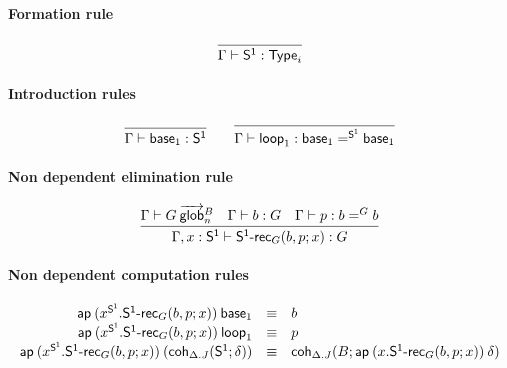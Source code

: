 \paragraph{Formation rule}

\begin{small}
  \[
  \infer{\wftype\Gamma{\dsd{S^1}}}{}
  \]
\end{small}

\paragraph{Introduction rules}

\begin{small}
  \[
  \infer{\ofglob{\Gamma}{\base{1}}{\dsd{S^1}}}{} \qquad
  \infer{\ofglob{\Gamma}{\lp{1}}{\homj{\dsd{S^1}}{\base{1}}{\base{1}}}}{}
  \]
\end{small}

\paragraph{Non dependent elimination rule}

\begin{small}
  \[
  \infer{\ofglob{\Gamma,x:\dsd{S^1}}{\dsd{S^1\text{-}rec}_G(b, p; x)}{G}}
  {\wfglob{\Gamma}{G}{B}n & \ofglob{\Gamma}{b}{G} &
    \ofglob{\Gamma}{p}{\homj{G}{b}{b}}}
  \]
\end{small}


\paragraph{Non dependent computation rules}

\begin{small}
  \[
  \begin{array}{rcl}
    \mathsf{ap} \: {(x^{\mathsf{S^1}}.\mathsf{S^1\text{-}rec}_G(b, p; x))} \: {\mathsf{base}_{1}} &
    \equiv & b \\
    \mathsf{ap} \: {(x^{\mathsf{S^1}}.\mathsf{S^1\text{-}rec}_G(b, p; x))} \: {\mathsf{loop}_{1}} & \equiv & p\\
    \mathsf{ap} \: {(x^{\mathsf{S^1}}.\mathsf{S^1\text{-}rec}_G(b, p; x))} \: {(\mathsf{coh}_{\Delta.J} ({\mathsf{S^1}};{\delta}))} & \equiv &
    \mathsf{coh}_{\Delta.J} ({B};{\mathsf{ap} \: {(x.\mathsf{S^1\text{-}rec}_G(b, p; x))} \: {\delta}})
    \\
  \end{array}
  \]
\end{small}

